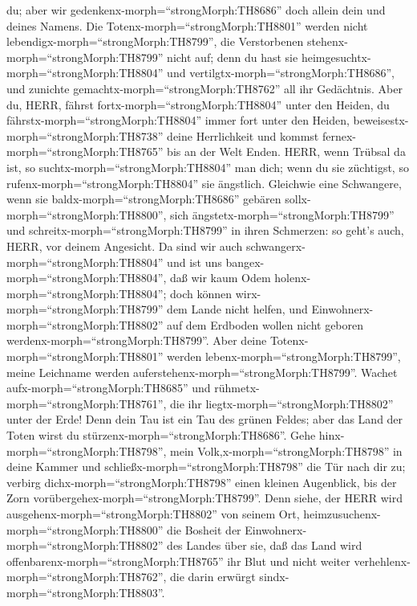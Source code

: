 du; aber wir gedenkenx-morph=``strongMorph:TH8686'' doch allein dein und
deines Namens.  Die Totenx-morph=``strongMorph:TH8801''
werden nicht lebendigx-morph=``strongMorph:TH8799'', die Verstorbenen
stehenx-morph=``strongMorph:TH8799'' nicht auf; denn du hast sie
heimgesuchtx-morph=``strongMorph:TH8804'' und
vertilgtx-morph=``strongMorph:TH8686'', und zunichte
gemachtx-morph=``strongMorph:TH8762'' all ihr Gedächtnis. 
Aber du, HERR, fährst fortx-morph=``strongMorph:TH8804'' unter den
Heiden, du fährstx-morph=``strongMorph:TH8804'' immer fort unter den
Heiden, beweisestx-morph=``strongMorph:TH8738'' deine Herrlichkeit und
kommst fernex-morph=``strongMorph:TH8765'' bis an der Welt Enden.
 HERR, wenn Trübsal da ist, so
suchtx-morph=``strongMorph:TH8804'' man dich; wenn du sie züchtigst, so
rufenx-morph=``strongMorph:TH8804'' sie ängstlich. 
Gleichwie eine Schwangere, wenn sie baldx-morph=``strongMorph:TH8686''
gebären sollx-morph=``strongMorph:TH8800'', sich
ängstetx-morph=``strongMorph:TH8799'' und
schreitx-morph=``strongMorph:TH8799'' in ihren Schmerzen: so geht's
auch, HERR, vor deinem Angesicht.  Da sind wir auch
schwangerx-morph=``strongMorph:TH8804'' und ist uns
bangex-morph=``strongMorph:TH8804'', daß wir kaum Odem
holenx-morph=``strongMorph:TH8804''; doch können
wirx-morph=``strongMorph:TH8799'' dem Lande nicht helfen, und
Einwohnerx-morph=``strongMorph:TH8802'' auf dem Erdboden wollen nicht
geboren werdenx-morph=``strongMorph:TH8799''.  Aber deine
Totenx-morph=``strongMorph:TH8801'' werden
lebenx-morph=``strongMorph:TH8799'', meine Leichname werden
auferstehenx-morph=``strongMorph:TH8799''. Wachet
aufx-morph=``strongMorph:TH8685'' und
rühmetx-morph=``strongMorph:TH8761'', die ihr
liegtx-morph=``strongMorph:TH8802'' unter der Erde! Denn dein Tau ist
ein Tau des grünen Feldes; aber das Land der Toten wirst du
stürzenx-morph=``strongMorph:TH8686''.  Gehe
hinx-morph=``strongMorph:TH8798'', mein
Volk,x-morph=``strongMorph:TH8798'' in deine Kammer und
schließx-morph=``strongMorph:TH8798'' die Tür nach dir zu; verbirg
dichx-morph=``strongMorph:TH8798'' einen kleinen Augenblick, bis der
Zorn vorübergehex-morph=``strongMorph:TH8799''.  Denn
siehe, der HERR wird ausgehenx-morph=``strongMorph:TH8802'' von seinem
Ort, heimzusuchenx-morph=``strongMorph:TH8800'' die Bosheit der
Einwohnerx-morph=``strongMorph:TH8802'' des Landes über sie, daß das
Land wird offenbarenx-morph=``strongMorph:TH8765'' ihr Blut und nicht
weiter verhehlenx-morph=``strongMorph:TH8762'', die darin erwürgt
sindx-morph=``strongMorph:TH8803''.

